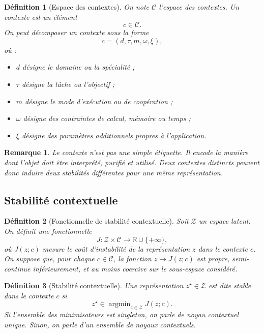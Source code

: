 \documentclass[11pt,a4paper]{article}
\newtheorem{definition}{Définition}[section]
\newtheorem{remark}{Remarque}[section]
\DeclareMathOperator{\argmin}{argmin}
\newcommand{\C}{\mathcal C}
\newcommand{\Z}{\mathcal Z}
\newcommand{\R}{\mathbb R}
\newcommand{\1}{\mathbf 1}
\begin{document}
\begin{definition}[Espace des contextes]
On note \(\C\) l'espace des contextes.
Un contexte est un élément
\[
c\in\C.
\]
On peut décomposer un contexte sous la forme
\[
c=(d,\tau,m,\omega,\xi),
\]
où :
\begin{itemize}[leftmargin=2em]
    \item \(d\) désigne le domaine ou la spécialité ;
    \item \(\tau\) désigne la tâche ou l'objectif ;
    \item \(m\) désigne le mode d'exécution ou de coopération ;
    \item \(\omega\) désigne des contraintes de calcul, mémoire ou temps ;
    \item \(\xi\) désigne des paramètres additionnels propres à l'application.
\end{itemize}
\end{definition}

\begin{remark}
Le contexte n'est pas une simple étiquette. Il encode la manière dont l'objet doit être interprété, purifié et utilisé.
Deux contextes distincts peuvent donc induire deux stabilités différentes pour une même représentation.
\end{remark}

\subsection{Stabilité contextuelle}

\begin{definition}[Fonctionnelle de stabilité contextuelle]
Soit \(\Z\) un espace latent.
On définit une fonctionnelle
\[
J:\Z\times\C\to\R\cup\{+\infty\},
\]
où \(J(z;c)\) mesure le coût d'instabilité de la représentation \(z\) dans le contexte \(c\).
On suppose que, pour chaque \(c\in\C\), la fonction \(z\mapsto J(z;c)\) est propre, semi-continue inférieurement, et au moins coercive sur le sous-espace considéré.
\end{definition}

\begin{definition}[Stabilité contextuelle]
Une représentation \(z^\star\in\Z\) est dite \emph{stable dans le contexte \(c\)} si
\[
z^\star\in\argmin_{z\in\Z} J(z;c).
\]
Si l'ensemble des minimisateurs est singleton, on parle de \emph{noyau contextuel unique}.
Sinon, on parle d'un \emph{ensemble de noyaux contextuels}.
\end{definition}
\end{document}
